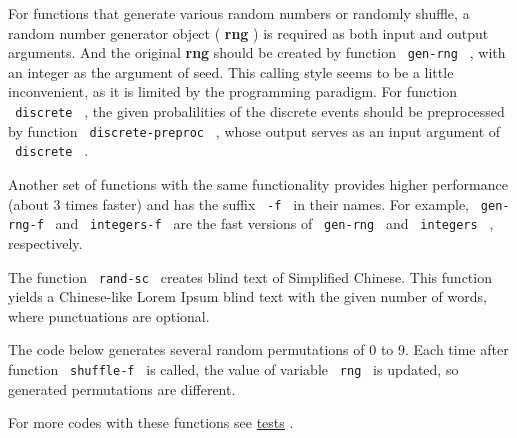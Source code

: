 \begin{Shaded}
\begin{Highlighting}[]
\end{Highlighting}
\end{Shaded}

For functions that generate various random numbers or randomly shuffle,
a random number generator object ( \textbf{rng} ) is required as both
input and output arguments. And the original \textbf{rng} should be
created by function \texttt{\ gen-rng\ } , with an integer as the
argument of seed. This calling style seems to be a little inconvenient,
as it is limited by the programming paradigm. For function
\texttt{\ discrete\ } , the given probalilities of the discrete events
should be preprocessed by function \texttt{\ discrete-preproc\ } , whose
output serves as an input argument of \texttt{\ discrete\ } .

Another set of functions with the same functionality provides higher
performance (about 3 times faster) and has the suffix \texttt{\ -f\ } in
their names. For example, \texttt{\ gen-rng-f\ } and
\texttt{\ integers-f\ } are the fast versions of \texttt{\ gen-rng\ }
and \texttt{\ integers\ } , respectively.

The function \texttt{\ rand-sc\ } creates blind text of Simplified
Chinese. This function yields a Chinese-like Lorem Ipsum blind text with
the given number of words, where punctuations are optional.

The code below generates several random permutations of 0 to 9. Each
time after function \texttt{\ shuffle-f\ } is called, the value of
variable \texttt{\ rng\ } is updated, so generated permutations are
different.

\begin{Shaded}
\begin{Highlighting}[]
\NormalTok{\#\{}
\NormalTok{    [\#(a.map(it =\textgreater{} str(it)).join("  ")) \textbackslash{} ]}
\NormalTok{  \}}
\NormalTok{\}}
\end{Highlighting}
\end{Shaded}


For more codes with these functions see
\href{https://github.com/typst/packages/raw/main/packages/preview/suiji/0.3.0/tests}{tests}
.

